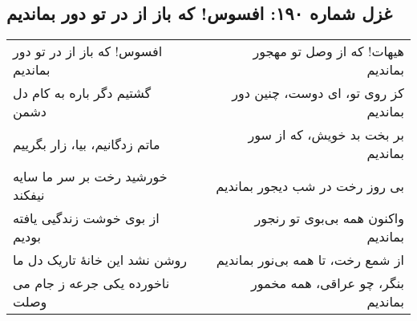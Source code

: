 \begin{center}
\section*{غزل شماره ۱۹۰: افسوس! که باز از در تو دور بماندیم}
\label{sec:190}
\begin{longtable}{l p{0.5cm} r}
افسوس! که باز از در تو دور بماندیم
&&
هیهات! که از وصل تو مهجور بماندیم
\\
گشتیم دگر باره به کام دل دشمن
&&
کز روی تو، ای دوست، چنین دور بماندیم
\\
ماتم زدگانیم، بیا، زار بگرییم
&&
بر بخت بد خویش، که از سور بماندیم
\\
خورشید رخت بر سر ما سایه نیفکند
&&
بی روز رخت در شب دیجور بماندیم
\\
از بوی خوشت زندگیی یافته بودیم
&&
واکنون همه بی‌بوی تو رنجور بماندیم
\\
روشن نشد این خانهٔ تاریک دل ما
&&
از شمع رخت، تا همه بی‌نور بماندیم
\\
ناخورده یکی جرعه ز جام می وصلت
&&
بنگر، چو عراقی، همه مخمور بماندیم
\\
\end{longtable}
\end{center}
